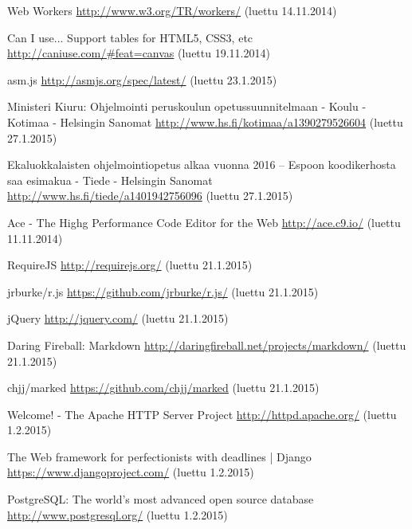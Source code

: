 \begin{thebibliography}{99}
	Web Workers \url{http://www.w3.org/TR/workers/} (luettu 14.11.2014)

	Can I use... Support tables for HTML5, CSS3, etc \url{http://caniuse.com/#feat=canvas} (luettu 19.11.2014)

	asm.js \url{http://asmjs.org/spec/latest/} (luettu 23.1.2015)

	Ministeri Kiuru: Ohjelmointi peruskoulun opetussuunnitelmaan - Koulu - Kotimaa - Helsingin Sanomat \url{http://www.hs.fi/kotimaa/a1390279526604} (luettu 27.1.2015)
	
	Ekaluokkalaisten ohjelmointiopetus alkaa vuonna 2016 – Espoon koodikerhosta saa esimakua - Tiede - Helsingin Sanomat \url{http://www.hs.fi/tiede/a1401942756096} (luettu 27.1.2015)

	Ace - The Highg Performance Code Editor for the Web \url{http://ace.c9.io/} (luettu 11.11.2014)

	RequireJS \url{http://requirejs.org/} (luettu 21.1.2015)
	
	jrburke/r.js \url{https://github.com/jrburke/r.js/} (luettu 21.1.2015)
	
	jQuery \url{http://jquery.com/} (luettu 21.1.2015)

	Daring Fireball: Markdown \url{http://daringfireball.net/projects/markdown/} (luettu 21.1.2015)
	
	chjj/marked \url{https://github.com/chjj/marked} (luettu 21.1.2015)
	
	Welcome! - The Apache HTTP Server Project \url{http://httpd.apache.org/} (luettu 1.2.2015)

	The Web framework for perfectionists with deadlines | Django \url{https://www.djangoproject.com/} (luettu 1.2.2015)

	PostgreSQL: The world's most advanced open source database \url{http://www.postgresql.org/} (luettu 1.2.2015)

\end{thebibliography}
